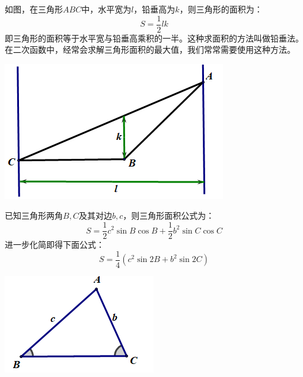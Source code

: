 \documentclass[10pt]{ctexart}
\begin{document}
\begin{minipage}[t]{0.7\textwidth}
\begin{dkli}{}{}
如图，在三角形$ABC$中，水平宽为$l$，铅垂高为$k$，则三角形的面积为：
\[S=\dfrac{1}{2}lk\]
即三角形的面积等于水平宽与铅垂高乘积的一半。这种求面积的方法叫做铅垂法。在二次函数中，经常会求解三角形面积的最大值，我们常常需要使用这种方法。
\end{dkli}
\end{minipage}
\begin{minipage}[t]{0.3\textwidth}
\includegraphics[scale=0.45]{figure/mj-12.png}
\end{minipage}

\begin{minipage}[t]{0.7\textwidth}
\begin{dkli}{}{}
已知三角形两角$B,C$及其对边$b,c$，则三角形面积公式为：
\[S=\dfrac{1}{2}c^2 \sin B \cos B+\dfrac{1}{2}b^2 \sin C \cos C\]
进一步化简即得下面公式：
\[S=\dfrac{1}{4}(c^2 \sin{2B}+b^2 \sin{2C})\]
\end{dkli}
\end{minipage}
\begin{minipage}[t]{0.3\textwidth}
\includegraphics[scale=0.6]{figure/mj-09.png}
\end{minipage}
\end{document}
